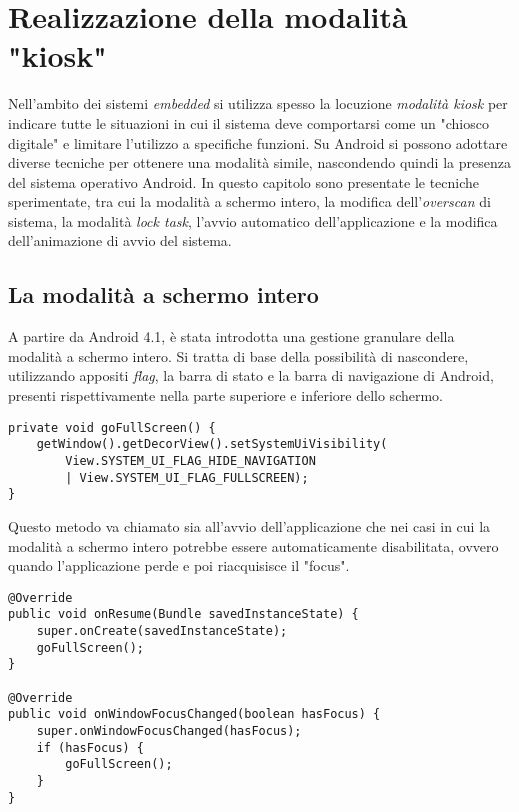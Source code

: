 \chapter{Realizzazione della modalità "kiosk"}
\label{cha:kiosk}

Nell'ambito dei sistemi \emph{embedded} si utilizza spesso la locuzione \emph{modalità kiosk} per indicare tutte le situazioni in cui il sistema deve comportarsi come un "chiosco digitale" e limitare l'utilizzo a specifiche funzioni. Su Android si possono adottare diverse tecniche per ottenere una modalità simile, nascondendo quindi la presenza del sistema operativo Android. In questo capitolo sono presentate le tecniche sperimentate, tra cui la modalità a schermo intero, la modifica dell'\emph{overscan} di sistema, la modalità \emph{lock task}, l'avvio automatico dell'applicazione e la modifica dell'animazione di avvio del sistema.

\section{La modalità a schermo intero}
\label{sec:kiosk_fullscreen}

A partire da Android 4.1, è stata introdotta una gestione granulare della modalità a schermo intero. Si tratta di base della possibilità di nascondere, utilizzando appositi \emph{flag}, la barra di stato e la barra di navigazione di Android, presenti rispettivamente nella parte superiore e inferiore dello schermo.

\begin{verbatim}
private void goFullScreen() {
    getWindow().getDecorView().setSystemUiVisibility(
        View.SYSTEM_UI_FLAG_HIDE_NAVIGATION
        | View.SYSTEM_UI_FLAG_FULLSCREEN);
}
\end{verbatim}

Questo metodo va chiamato sia all'avvio dell'applicazione che nei casi in cui la modalità a schermo intero potrebbe essere automaticamente disabilitata, ovvero quando l'applicazione perde e poi riacquisisce il "focus".

\begin{verbatim}
@Override
public void onResume(Bundle savedInstanceState) {
    super.onCreate(savedInstanceState);
    goFullScreen();
}

@Override
public void onWindowFocusChanged(boolean hasFocus) {
    super.onWindowFocusChanged(hasFocus);
    if (hasFocus) {
        goFullScreen();
    }
}
\end{verbatim}


